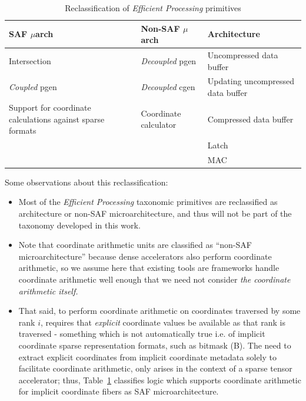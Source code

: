 \begin{table}
\centering
\caption{Reclassification of \textit{Efficient Processing}\cite{szebook} primitives}
\label{tab:reclassify_saf_microarchitecture}
\begin{tabular}{||p{}|l|l||}\hline
\textbf{SAF $\mu$arch} & \textbf{Non-SAF $\mu$arch} & \textbf{Architecture}  \\\hline
Intersection & \textit{Decoupled} pgen & Uncompressed data buffer \\\hline
\textit{Coupled} pgen & \textit{Decoupled} cgen & Updating uncompressed data buffer \\\hline
Support for coordinate calculations against sparse formats & Coordinate calculator & Compressed data buffer \\\hline
 &  & Latch \\\hline
 &  & MAC \\\hline
\end{tabular}
\end{table}

Some observations about this reclassification:
\begin{itemize}
    \item Most of the \textit{Efficient Processing} taxonomic primitives are reclassified as architecture or non-SAF microarchitecture, and thus will not be part of the taxonomy developed in this work.
    \item Note that coordinate arithmetic units are classified as ``non-SAF microarchitecture'' because dense accelerators also perform coordinate arithmetic, so we assume here that existing tools are frameworks handle coordinate arithmetic well enough that we need not consider \textit{the coordinate arithmetic itself.}
    \item That said, to perform coordinate arithmetic on coordinates traversed by some rank $i$, requires that \textit{explicit}\cite{szebook} coordinate values be available as that rank is traversed - something which is not automatically true i.e. of implicit coordinate sparse representation formats, such as bitmask (B)\cite{szebook}. The need to extract explicit coordinates from implicit coordinate metadata solely to facilitate coordinate arithmetic, only arises in the context of a sparse tensor accelerator; thus, Table~\ref{tab:reclassify_saf_microarchitecture} classifies logic which supports coordinate arithmetic for implicit coordinate fibers as SAF microarchitecture.
\end{itemize}

